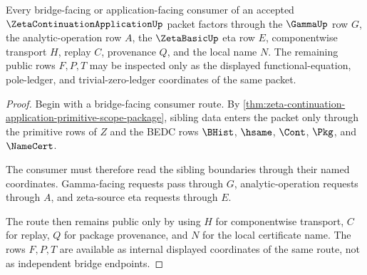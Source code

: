 \begin{theorem}
\label{thm:zeta-continuation-application-bridge-consumer-boundary}
Every bridge-facing or application-facing consumer of an accepted $\ZetaContinuationApplicationUp$ packet factors through the $\GammaUp$ row $G$, the analytic-operation row $A$, the $\ZetaBasicUp$ eta row $E$, componentwise transport $H$, replay $C$, provenance $Q$, and the local name $N$. The remaining public rows $F,P,T$ may be inspected only as the displayed functional-equation, pole-ledger, and trivial-zero-ledger coordinates of the same packet.
\end{theorem}
\begin{proof}
Begin with a bridge-facing consumer route. By \autoref{thm:zeta-continuation-application-primitive-scope-package}, sibling data enters the packet only through the primitive rows of $Z$ and the BEDC rows $\BHist$, $\hsame$, $\Cont$, $\Pkg$, and $\NameCert$.

The consumer must therefore read the sibling boundaries through their named coordinates. Gamma-facing requests pass through $G$, analytic-operation requests through $A$, and zeta-source eta requests through $E$.

The route then remains public only by using $H$ for componentwise transport, $C$ for replay, $Q$ for package provenance, and $N$ for the local certificate name. The rows $F,P,T$ are available as internal displayed coordinates of the same route, not as independent bridge endpoints.
\end{proof}

